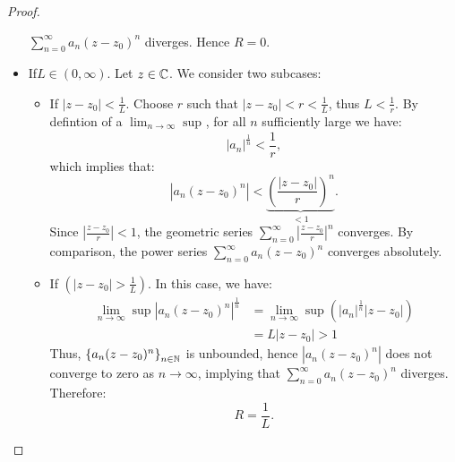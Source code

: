 \begin{proof}
\begin{itemize}
   $\sum_{n=0}^{\infty} a_n (z-z_0) ^n  $ diverges. Hence $R = 0 $.
 \item[\ding{50} \ding{174}] If$L \in  (0, \infty ) $. Let $z \in  \mathbb{C}  $. We consider two subcases:
     \begin{itemize}
       \item[\ding{182}] If $ \left| z-z_0 \right| < \frac{1}{L}$. Choose $r $ such that 
       $\left| z-z_0 \right|<  r < \frac{1}{L} $, thus $L < \frac{1}{r} $. By defintion of a $\lim_{n \to \infty} \sup_{}  $,
       for all $n $ sufficiently large we have: 
       \[
       \left| a_n  \right|^{\frac{1}{n}} <  \frac{1}{r},
       \]
       which implies that: 
       \[
       \left| a_n (z-z_0) ^n  \right| <  
       \underbrace{
         \left( 
           \frac{\left| z-z_0 \right|}{r}
         \right)^n 
       }_{<  1}. 
       \]
       Since $\left| \frac{z-z_0}{r} \right| <  1$, the geometric series $\sum_{n=0}^{\infty} \left| \frac{z-z_0}{r} \right|^n $ converges. By comparison, the power series $\sum_{n=0}^{\infty} a_n (z-z_0) ^n  $ converges absolutely.
     \item[\ding{183}] 
        If $(\left| z-z_0 \right| > \frac{1}{L})  $. In this case, we have:
        \begin{align*}
        \lim_{n \to \infty} \sup_{} 
        \left| a_n (z-z_0) ^n  \right|^{\frac{1}{n}} & = 
        \lim_{n \to \infty} \sup_{} 
        \left( 
          \left| a_n  \right|^{\frac{1}{n}} \left| z-z_0 \right| 
        \right) \\
        &=
        L \left| z-z_0 \right| > 1
        \end{align*}
        Thus, $\left\{ a_n (z-z_0) ^n  \right\}_{n \in  \mathbb{N}} $  is unbounded, hence 
        $\left| a_n (z-z_0) ^n  \right| $  does not converge to zero as $n \rightarrow \infty  $, 
        implying that $\sum_{n=0}^{\infty} a_n (z-z_0) ^n  $  diverges. Therefore:
        \[
        R = \frac{1}{L}.
        \]
     \end{itemize}
  \end{itemize}
\end{proof}
